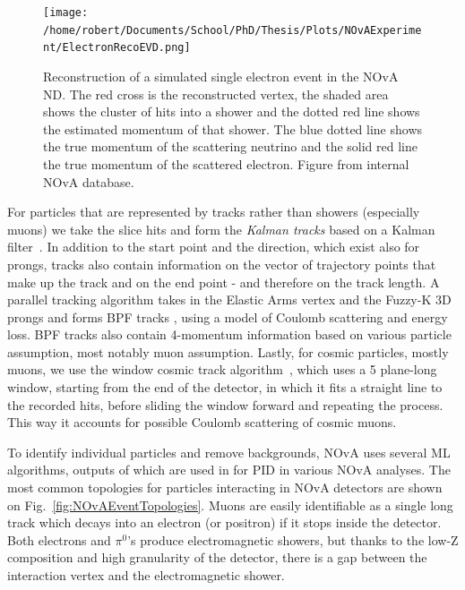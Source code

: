\begin{figure}[ht]
\centering
\texttt{[image: /home/robert/Documents/School/PhD/Thesis/Plots/NOvAExperiment/ElectronRecoEVD.png]}
\caption[NOvA reconstruction of a single electron]{Reconstruction of a simulated single electron event in the \acrshort{NOvA} \acrshort{ND}. The red cross is the reconstructed vertex, the shaded area shows the cluster of hits into a shower and the dotted red line shows the estimated momentum of that shower. The blue dotted line shows the true momentum of the scattering neutrino and the solid red line the true momentum of the scattered electron. Figure from internal \acrshort{NOvA} database.}
\label{fig:NOvARecoEVD}
\end{figure}

For particles that are represented by tracks rather than showers (especially muons) we take the slice hits and form the \textit{Kalman tracks} based on a Kalman filter~\cite{RaddatzNOvAThesis_KalmanTracks.pdf}. In addition to the start point and the direction, which exist also for prongs, tracks also contain information on the vector of trajectory points that make up the track and on the end point - and therefore on the track length. A parallel tracking algorithm takes in the Elastic Arms vertex and the Fuzzy-K 3D prongs and forms \gls{BPF} tracks \cite{BairdNOvAThesis_BPFTracks.pdf,BreakPointFitterBasics.pdf}, using a model of Coulomb scattering and energy loss. \gls{BPF} tracks also contain 4-momentum information based on various particle assumption, most notably muon assumption. Lastly, for cosmic particles, mostly muons, we use the window cosmic track algorithm~\cite{NOVA-doc-15977}, which uses a 5 plane-long window, starting from the end of the detector, in which it fits a straight line to the recorded hits, before sliding the window forward and repeating the process. This way it accounts for possible Coulomb scattering of cosmic muons.


To identify individual particles and remove backgrounds, \gls{NOvA} uses several \gls{ML} algorithms, outputs of which are used in for \gls{PID} in various \gls{NOvA} analyses. The most common topologies for particles interacting in \gls{NOvA} detectors are shown on Fig.~\ref{fig:NOvAEventTopologies}. Muons are easily identifiable as a single long track which decays into an electron (or positron) if it stops inside the detector. Both electrons and $\pi^0$'s produce electromagnetic showers, but thanks to the low-Z composition and high granularity of the detector, there is a gap between the interaction vertex and the electromagnetic shower.


